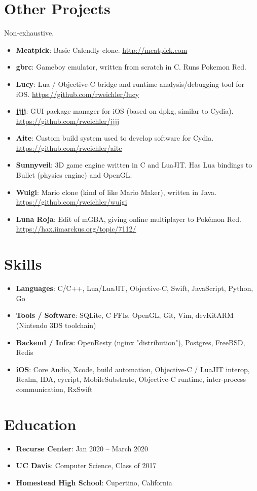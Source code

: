 \documentclass[letterpaper,11pt]{article}
\newcommand{\resumeItem}[2]{
  \item\small{
    \textbf{#1}{: #2 \vspace{-2.5pt}}
  }
}
\newcommand{\resumeItemAIDS}[2]{
  \item\small{
    \textbf{#1}{: #2 \vspace{-6.5pt}}
  }
}
\newcommand{\resumeSubItem}[2]{\resumeItem{#1}{#2}\vspace{-4.5pt}}
\newcommand{\resumeSubHeadingListStart}{\begin{itemize}[leftmargin=*]}
\newcommand{\resumeSubHeadingListEnd}{\end{itemize}}
\newcommand{\resumeItemListStart}{\begin{itemize}}
\newcommand{\resumeItemListEnd}{\end{itemize}\vspace{-5pt}}
\begin{document}
\section{Other Projects}
    Non-exhaustive.\vspace{-2pt}
  \resumeSubHeadingListStart
    \resumeSubItem{Meatpick}
      {Basic Calendly clone. \href{http://meatpick.com}{http://meatpick.com}}
    \resumeSubItem{gbrc}
      {Gameboy emulator, written from scratch in C. Runs Pokemon Red.}
    \resumeSubItem{Lucy}
      {Lua / Objective-C bridge and runtime analysis/debugging tool for iOS. \href{https://github.com/rweichler/lucy}{https://github.com/rweichler/lucy}}
    \resumeSubItem{jjjj}
      {GUI package manager for iOS (based on dpkg, similar to Cydia).  \href{https://github.com/rweichler/jjjj}{https://github.com/rweichler/jjjj}}
    \resumeSubItem{Aite}
      {Custom build system used to develop software for Cydia. \href{https://github.com/rweichler/aite}{https://github.com/rweichler/aite}}
    \resumeSubItem{Sunnyveil}
      {3D game engine written in C and LuaJIT. Has Lua bindings to Bullet (physics engine) and OpenGL.}
    \resumeSubItem{Wuigi}
      {Mario clone (kind of like Mario Maker), written in Java. \href{https://github.com/rweichler/wuigi}{https://github.com/rweichler/wuigi}}
    \resumeSubItem{Luna Roja}
      {Edit of mGBA, giving online multiplayer to Pok\'emon Red.  \href{https://hax.iimarckus.org/topic/7112/}{https://hax.iimarckus.org/topic/7112/}}
  \resumeSubHeadingListEnd

  
\section{Skills}
    \resumeItemListStart
        \resumeItemAIDS{Languages}
            {C/C++, Lua/LuaJIT, Objective-C, Swift, JavaScript, Python, Go}
        \resumeItemAIDS{Tools / Software}
            {SQLite, C FFIs, OpenGL, Git, Vim, devKitARM (Nintendo 3DS toolchain)}
        \resumeItemAIDS{Backend / Infra}
            {OpenResty (nginx "distribution"), Postgres, FreeBSD, Redis}
        \resumeItemAIDS{iOS}
            {Core Audio, Xcode, build automation, Objective-C / LuaJIT interop, Realm, IDA, cycript, MobileSubstrate, Objective-C runtime, inter-process communication, RxSwift}
    \resumeItemListEnd


\section{Education}
  \resumeSubHeadingListStart
    \resumeSubItem
      {Recurse Center}{Jan 2020 -- March 2020}
    \resumeSubItem
      {UC Davis}{Computer Science, Class of 2017}
    \resumeSubItem
      {Homestead High School}{Cupertino, California}
  \resumeSubHeadingListEnd
\end{document}

